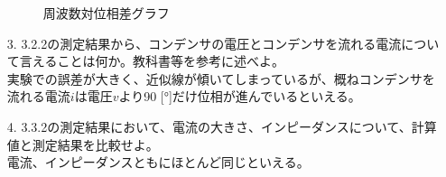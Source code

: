 \documentclass[uplatex]{jsarticle}
\begin{document}
\begin{enumerate}
\begin{figure}[h]
\begin{minipage}{0.5\hsize}
\begin{center}
						\end{center}
						\caption{周波数対位相差グラフ}
					\end{minipage}
				\end{figure}
			\item[3.]{3.2.2の測定結果から、コンデンサの電圧とコンデンサを流れる電流について言えることは何か。教科書等を参考に述べよ。} \\
				実験での誤差が大きく、近似線が傾いてしまっているが、概ねコンデンサを流れる電流$i$は電圧$v$より90 [°]だけ位相が進んでいるといえる。
			\item[4.]{3.3.2の測定結果において、電流の大きさ、インピーダンスについて、計算値と測定結果を比較せよ。} \\
				電流、インピーダンスともにほとんど同じといえる。
		\end{enumerate}
\end{document}
